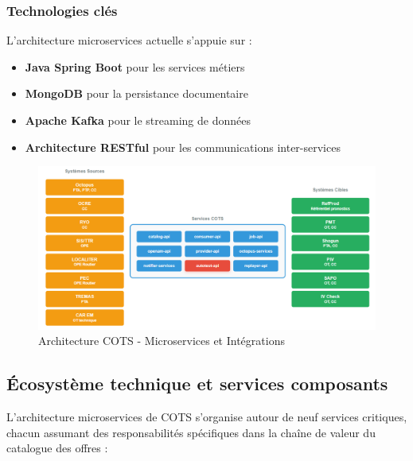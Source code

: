 \subsubsection{Technologies clés}

L'architecture microservices actuelle s'appuie sur :
\begin{itemize}
    \item \textbf{Java Spring Boot} pour les services métiers
    \item \textbf{MongoDB} pour la persistance documentaire
    \item \textbf{Apache Kafka} pour le streaming de données
    \item \textbf{Architecture RESTful} pour les communications inter-services
\end{itemize}

\begin{figure}[H]
    \centering
    \includegraphics[scale=0.8]{figures/achitecture_cots.png}
    \caption{Architecture COTS - Microservices et Intégrations}
    \label{fig:architecture_cots}
\end{figure}

\subsection{Écosystème technique et services composants}

L'architecture microservices de COTS s'organise autour de neuf services critiques, chacun assumant des responsabilités spécifiques dans la chaîne de valeur du catalogue des offres :


